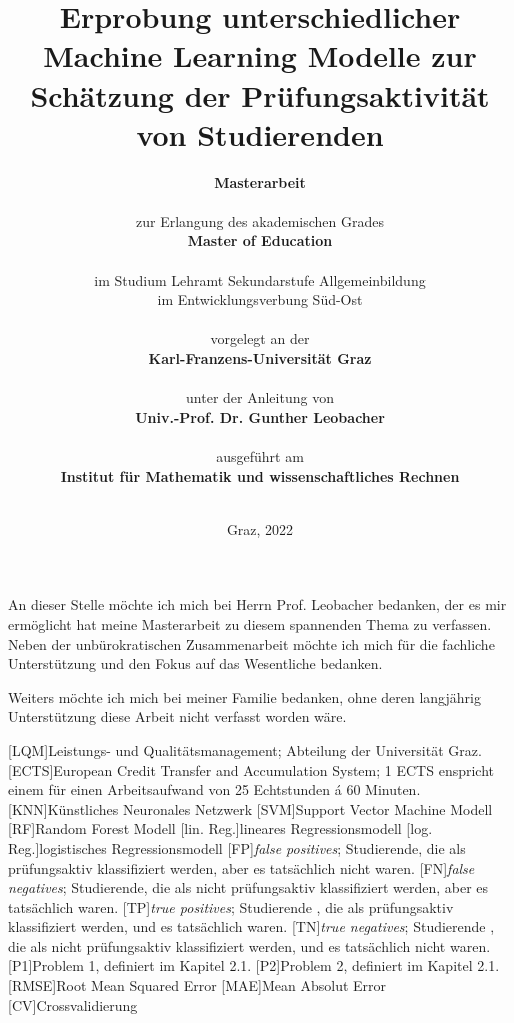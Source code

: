 \documentclass[
    fontsize=12pt,
    paper=A4,
    parskip=full, %
    bibliography=totoc,
    abstract=on,
    listof=totoc,
]{scrreprt} %
\title{
        {Erprobung unterschiedlicher Machine Learning Modelle zur Sch\"atzung der Pr\"ufungsaktivit\"at von Studierenden}
        }
\author{
        
        \Huge{\textbf{Masterarbeit}} \\
        \ \\
        \large{zur Erlangung des akademischen Grades} \\
        \large{\textbf{Master of Education}}\\ 
        \\
        \large{im Studium Lehramt Sekundarstufe Allgemeinbildung}\\
        \large{im Entwicklungsverbung Süd-Ost}\\
        \ \\
        \large{vorgelegt an der} \\
        \large{\textbf{Karl-Franzens-Universität Graz}}\\
        \\
        \large{unter der Anleitung von} \\
        \large{\textbf{Univ.-Prof. Dr. Gunther Leobacher}} \\
        \\
        \large{ausgef\"uhrt am}\\
        \large{\textbf{Institut f\"ur Mathematik und wissenschaftliches Rechnen}}
        \\
        \\
        }
\date{ \normalsize{Graz, 2022}}
\begin{document}
\begin{singlespace}
    \maketitle
    \setcounter{page}{2}
\end{singlespace}




An dieser Stelle m\"ochte ich mich bei Herrn Prof. Leobacher bedanken, der es mir erm\"oglicht hat meine Masterarbeit zu
diesem spannenden Thema zu verfassen. Neben der unb\"urokratischen Zusammenarbeit m\"ochte ich mich f\"ur die fachliche
Unterst\"utzung und den Fokus auf das Wesentliche bedanken.

Weiters m\"ochte ich mich bei meiner Familie bedanken, ohne deren langj\"ahrig Unterst\"utzung
diese Arbeit nicht verfasst worden w\"are.



\tableofcontents %


\begin{acronym}
    [LQM]{Leistungs- und Qualit\"atsmanagement; Abteilung der Universität Graz.}
    [ECTS]{European Credit Transfer and Accumulation System; 1 ECTS enspricht einem f\"ur einen Arbeitsaufwand von 25 Echtstunden \'a 60 Minuten.}
    [KNN]{K\"unstliches Neuronales Netzwerk}
    [SVM]{Support Vector Machine Modell}
    [RF]{Random Forest Modell}
    [lin. Reg.]{lineares Regressionsmodell}
    [log. Reg.]{logistisches Regressionsmodell}
    [FP]{\textit{false positives}; Studierende, die als pr\"ufungsaktiv klassifiziert werden, aber es tats\"achlich nicht waren.}
    [FN]{\textit{false negatives}; Studierende, die als nicht pr\"ufungsaktiv klassifiziert werden, aber es tats\"achlich waren.}
    [TP]{\textit{true positives}; Studierende , die als pr\"ufungsaktiv klassifiziert werden, und es tats\"achlich waren.}
    [TN]{\textit{true negatives}; Studierende , die als nicht pr\"ufungsaktiv klassifiziert werden, und es tats\"achlich nicht waren.}
    [P1]{Problem 1, definiert im Kapitel 2.1.}
    [P2]{Problem 2, definiert im Kapitel 2.1.}
    [RMSE]{Root Mean Squared Error}
    [MAE]{Mean Absolut Error}
    [CV]{Crossvalidierung}

\end{acronym}
\end{document}
